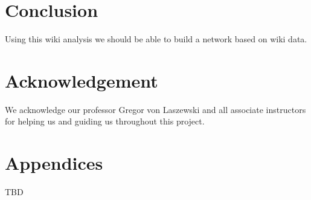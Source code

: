 \documentclass[9pt,twocolumn,twoside]{../../styles/osajnl}
\begin{document}
\section{Conclusion}

Using this wiki analysis we should be able to build a network based on wiki data.

\section{Acknowledgement}

We acknowledge our professor Gregor von Laszewski and all associate instructors for helping us and guiding us throughout this project.

\section{Appendices}
TBD



 
\end{document}
